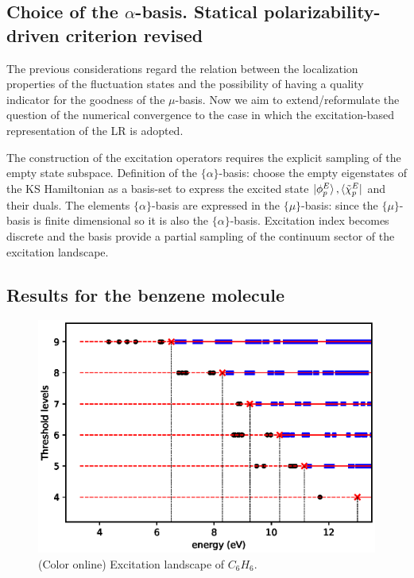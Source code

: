 \documentclass[reprint,aps,prb]{revtex4-1}
\begin{document}
\subsection{Choice of the $\alpha$-basis. Statical polarizability-driven criterion revised}

The previous considerations regard the relation between the localization properties of the fluctuation states and the possibility of having a quality indicator for the goodness of the $\mu$-basis. 
Now we aim to extend/reformulate the question of the numerical convergence to the case in which the excitation-based representation of the LR is adopted.

The construction of the excitation operators requires the explicit sampling of the empty state subspace. Definition of the $\{\alpha\}$-basis: choose the empty eigenstates of the KS Hamiltonian as a 
basis-set to express the excited state $\ket{\phi^E_p},\bra{\tilde\chi^E_p}$ and their duals. The elements $\{\alpha\}$-basis are expressed in the $\{\mu\}$-basis: since the $\{\mu\}$-basis is finite 
dimensional so it is also the $\{\alpha\}$-basis. Excitation index becomes discrete and the basis provide a partial sampling of the continuum sector of the excitation landscape.   




\subsection{Results for the benzene molecule}

\begin{figure}[ht]
\includegraphics[scale=0.56]{c6h6_excitationLandscape.eps}
\caption{\label{c6h6_excLand}(Color online) Excitation landscape of $C_6H_6$.}
\end{figure}
\end{document}
